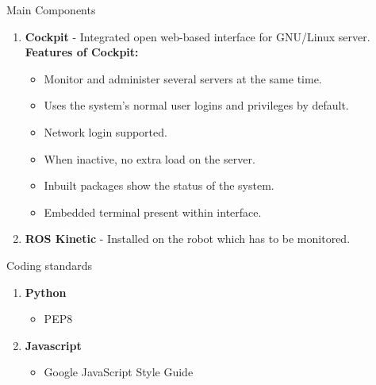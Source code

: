 \documentclass[aspectratio=169]{beamer}
\begin{document}
\begin{frame}{Main Components}
\vspace*{-10mm}
\linespread{1.5}
\begin{enumerate}
	\item \textbf{Cockpit} - Integrated open web-based interface for GNU/Linux server.\\ \textbf{Features of Cockpit:}
	\begin{itemize}
	\item Monitor and administer several servers at the same time.
	\item Uses the system’s normal user logins and privileges by default. 
	\item Network login supported.
	\item When inactive, no extra load on the server.
	\item Inbuilt packages show the status of the system.
	\item Embedded terminal present within interface.
	\end{itemize}
	\item \justify \textbf{ROS Kinetic} - Installed on the robot which has to be monitored.
\end{enumerate}
	
\end{frame}

\begin{frame}{Coding standards}
\vspace*{-25mm}
\linespread{2}
\begin{enumerate}
	\item \textbf{Python}
	\begin{itemize}
	\item PEP8
	\end{itemize}
	\item \textbf{Javascript}
		\begin{itemize}
	\item Google JavaScript Style Guide
	\end{itemize}
\end{enumerate}
	
\end{frame}
\end{document}

